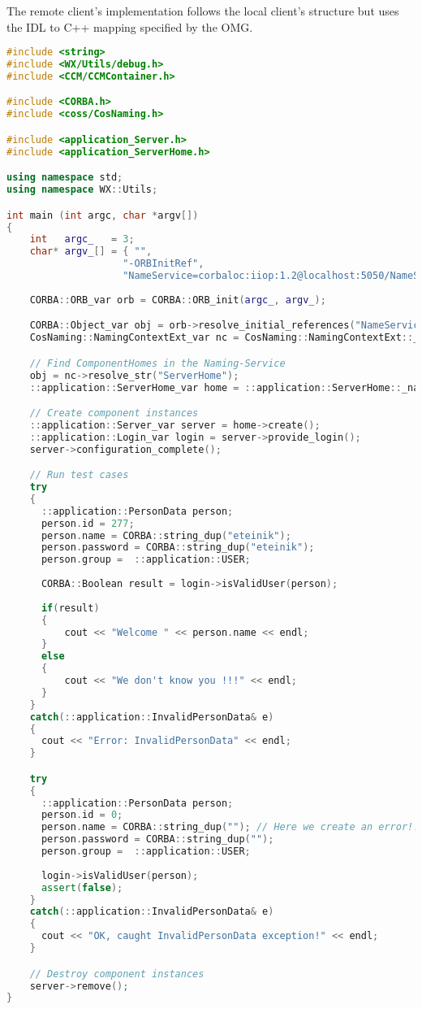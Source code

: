 The remote client's implementation follows the local client's structure but uses
the IDL to C++ mapping specified by the OMG.

\begin{footnotesize}
\begin{lstlisting}[language=C++]
#include <string>
#include <WX/Utils/debug.h>
#include <CCM/CCMContainer.h>

#include <CORBA.h>
#include <coss/CosNaming.h>

#include <application_Server.h>
#include <application_ServerHome.h>

using namespace std;
using namespace WX::Utils;

int main (int argc, char *argv[])
{
    int   argc_   = 3;
    char* argv_[] = { "", 
                    "-ORBInitRef", 
                    "NameService=corbaloc:iiop:1.2@localhost:5050/NameService"};
 
    CORBA::ORB_var orb = CORBA::ORB_init(argc_, argv_);

    CORBA::Object_var obj = orb->resolve_initial_references("NameService");
    CosNaming::NamingContextExt_var nc = CosNaming::NamingContextExt::_narrow(obj);

    // Find ComponentHomes in the Naming-Service
    obj = nc->resolve_str("ServerHome");
    ::application::ServerHome_var home = ::application::ServerHome::_narrow(obj);

    // Create component instances
    ::application::Server_var server = home->create();
    ::application::Login_var login = server->provide_login();
    server->configuration_complete();

	// Run test cases
    try 
    {
      ::application::PersonData person;
      person.id = 277;
      person.name = CORBA::string_dup("eteinik");
      person.password = CORBA::string_dup("eteinik");   
      person.group =  ::application::USER;       
      
      CORBA::Boolean result = login->isValidUser(person);
      
      if(result) 
      {
          cout << "Welcome " << person.name << endl;
      }
      else 
      {
          cout << "We don't know you !!!" << endl;
      }
    }
    catch(::application::InvalidPersonData& e)
    {
      cout << "Error: InvalidPersonData" << endl;	
    }

    try 
    {
      ::application::PersonData person;
      person.id = 0;
      person.name = CORBA::string_dup(""); // Here we create an error!!!
      person.password = CORBA::string_dup("");   
      person.group =  ::application::USER;       
      
      login->isValidUser(person);
      assert(false); 
    }
    catch(::application::InvalidPersonData& e)
    {
      cout << "OK, caught InvalidPersonData exception!" << endl;	
    }

    // Destroy component instances
    server->remove();
}
\end{lstlisting}
\end{footnotesize}

